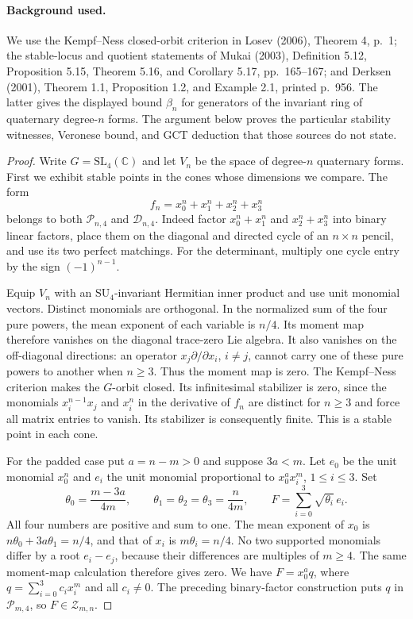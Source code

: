 \paragraph{Background used.}
We use the Kempf--Ness closed-orbit criterion in Losev (2006),
Theorem 4, p.~1; the stable-locus and quotient statements of
Mukai (2003), Definition 5.12, Proposition 5.15, Theorem 5.16,
and Corollary 5.17, pp.~165--167; and Derksen (2001),
Theorem 1.1, Proposition 1.2, and Example 2.1, printed p.~956.
The latter gives the displayed bound $\beta_n$ for generators
of the invariant ring of quaternary degree-$n$ forms.
The argument below proves the particular stability witnesses,
Veronese bound, and GCT deduction that those sources do not state.
\begin{proof}
Write $G=\mathrm{SL}_4(\mathbb C)$ and let $V_n$ be the space
of degree-$n$ quaternary forms. First we exhibit stable points
in the cones whose dimensions we compare. The form
\[
 f_n=x_0^n+x_1^n+x_2^n+x_3^n
\]
belongs to both $\mathcal P_{n,4}$ and $\mathcal D_{n,4}$.
Indeed factor $x_0^n+x_1^n$ and $x_2^n+x_3^n$ into binary
linear factors, place them on the diagonal and directed cycle
of an $n\times n$ pencil, and use its two perfect matchings.
For the determinant, multiply one cycle entry by the sign
$(-1)^{n-1}$.

Equip $V_n$ with an $\mathrm{SU}_4$-invariant Hermitian inner
product and use unit monomial vectors. Distinct monomials are
orthogonal. In the normalized sum of the four pure powers,
the mean exponent of each variable is $n/4$. Its moment map
therefore vanishes on the diagonal trace-zero Lie algebra.
It also vanishes on the off-diagonal directions: an operator
$x_j\partial/\partial x_i$, $i\ne j$, cannot carry one of
these pure powers to another when $n\geq3$. Thus the moment
map is zero. The Kempf--Ness criterion makes the $G$-orbit
closed. Its infinitesimal stabilizer is zero, since the
monomials $x_i^{n-1}x_j$ and $x_i^n$ in the derivative of
$f_n$ are distinct for $n\geq3$ and force all matrix entries
to vanish. Its stabilizer is consequently finite. This is a
stable point in each cone.

For the padded case put $a=n-m>0$ and suppose $3a<m$.
Let $e_0$ be the unit monomial $x_0^n$ and $e_i$ the unit
monomial proportional to $x_0^a x_i^m$, $1\leq i\leq3$.
Set
\[
 \theta_0=\frac{m-3a}{4m},\qquad
 \theta_1=\theta_2=\theta_3=\frac{n}{4m},\qquad
 F=\sum_{i=0}^3\sqrt{\theta_i}\,e_i.
\]
All four numbers are positive and sum to one. The mean
exponent of $x_0$ is $n\theta_0+3a\theta_1=n/4$, and
that of $x_i$ is $m\theta_i=n/4$. No two supported monomials
differ by a root $e_i-e_j$, because their differences are
multiples of $m\geq4$. The same moment-map calculation
therefore gives zero. We have $F=x_0^a q$, where
$q=\sum_{i=0}^3 c_i x_i^m$ and all $c_i\ne0$.
The preceding binary-factor construction puts $q$ in
$\mathcal P_{m,4}$, so $F\in\mathcal Z_{m,n}$.


\end{proof}
